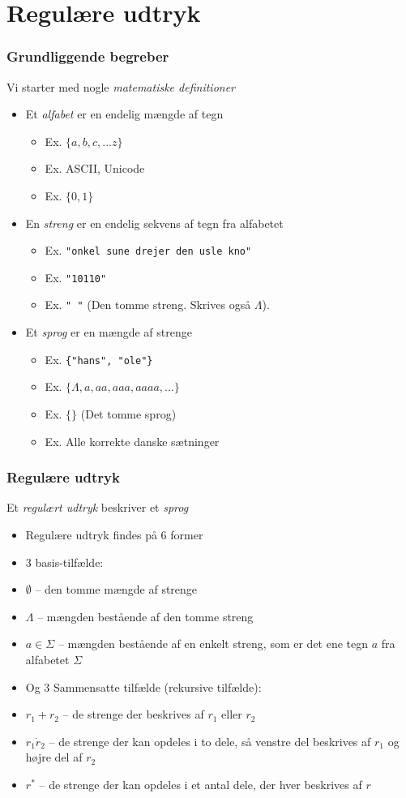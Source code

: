 \documentclass[]{beamer}
\begin{document}
\section{Regulære udtryk}
\begin{frame}
\frametitle{Grundliggende begreber}
Vi starter med nogle \emph{matematiske definitioner}
\begin{itemize}[<+->]
\item Et \emph{alfabet} er en endelig mængde af tegn
\begin{itemize}
    \item Ex. $\{a,b,c,...z\}$
    \item Ex. ASCII, Unicode
    \item Ex. $\{0, 1\}$
\end{itemize}
\item En \emph{streng} er en endelig sekvens af tegn fra alfabetet
\begin{itemize}
    \item Ex. \texttt{"onkel sune drejer den usle kno"}
    \item Ex. \texttt{"10110"}
    \item Ex. \texttt{"\,"}  (Den tomme streng. Skrives også $\Lambda$).
\end{itemize}
\item Et \emph{sprog} er en mængde af strenge
\begin{itemize}
\item Ex. \texttt{\{"hans", "ole"\}}
\item Ex. $\{\Lambda, a, aa, aaa, aaaa, ...\}$
\item Ex. $\{\}$ (Det tomme sprog)
\item Ex. Alle korrekte danske sætninger
\end{itemize}
\end{itemize}
\end{frame}

\begin{frame}
\frametitle{Regulære udtryk}
Et \emph{regulært udtryk} beskriver et \emph{sprog}
\begin{itemize}
\item Regulære udtryk findes på 6 former
\item 3 basis-tilfælde:
\item $\emptyset$  	– den tomme mængde af strenge
\item $\Lambda$  	– mængden bestående af den tomme streng
\item $a\in\Sigma$	– mængden bestående af en enkelt streng, som
        	   er det ene tegn $a$ fra alfabetet $\Sigma$
\item Og 3 Sammensatte tilfælde (rekursive tilfælde):
\item $r_1+r_2$	– de strenge der beskrives af $r_1$ eller $r_2$
\item $r_1\dot r_2$	– de strenge der kan opdeles i to dele, så 
 	   venstre del beskrives af $r_1$ og højre del af $r_2$
\item $r^*$	– de strenge der kan opdeles i et antal dele,
		   der hver beskrives af $r$
\end{itemize}
\end{frame}
\end{document}
